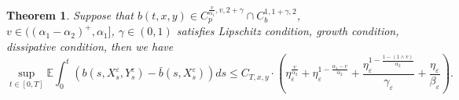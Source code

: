\documentclass[11pt,reqno]{amsart}
\newtheorem{theorem}{\indent Theorem}[section]
\numberwithin{equation}{section}
\begin{document}
\begin{theorem}\label{T62}
	Suppose that $b(t,x,y)\in C_{p}^{\frac{v}{\alpha_{1}},v,2+\gamma}\cap C_{b}^{1,1+\gamma,2}$, $v\in((\alpha_{1}-\alpha_{2})^{+},\alpha_{1}]$,  $\gamma\in (0,1)$ satisfies Lipschitz condition, growth condition, dissipative condition,  then we have 
	\begin{equation}\label{6.31}
		\sup_{t\in [0,T]}\mathbb{E}\int_{0}^{t}\left( b(s,X_{s}^{\varepsilon},Y_{s}^{\varepsilon})-\bar{b}(s,X_{s}^{\varepsilon})\right)ds\leq C_{T,x,y}\cdot \left(\eta_{\varepsilon}^{\frac{v}{\alpha_{2}}}+\eta_{\varepsilon}^{1-\frac{\alpha_{1}-v}{\alpha_{2}}}+\frac{\eta_{\varepsilon}^{1-\frac{1-(1\wedge v)}{\alpha_{2}}}}{\gamma_{\varepsilon}}+\frac{\eta_{\varepsilon}}{\beta_{\varepsilon}}\right).
	\end{equation}
\end{theorem}
\end{document}
